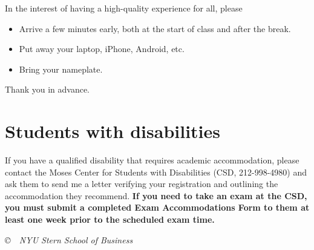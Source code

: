 \documentclass[12pt]{article}
\begin{document}
In the interest of having a high-quality experience for all,
please
%
\begin{itemize}
\item Arrive a few minutes early,
both at the start of class and after the break.

\item Put away your laptop, iPhone, Android, etc.

\item Bring your nameplate.

%
\end{itemize}
Thank you in advance.


\section{Students with disabilities}

If you have a qualified disability that requires academic accommodation,
please contact the Moses Center for Students with Disabilities (CSD, 212-998-4980) and ask them to
send me a letter verifying your registration and outlining the accommodation they recommend.
{\bf If you need to take an exam at the CSD,
you must submit a completed Exam Accommodations Form to them
at least one week prior to the scheduled exam time.}

\vfill
\centerline{\it \copyright \ \number\year \ NYU Stern School of Business}
\end{document}
